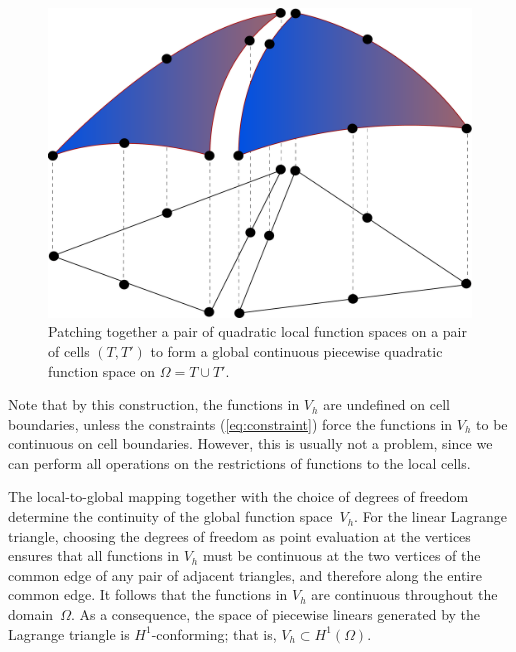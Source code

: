 \begin{figure}
  \begin{center}
    \includegraphics[width=\largefig]{chapters/kirby-7/pdf/femspace.pdf}
    \caption{Patching together a pair of quadratic local function
      spaces on a pair of cells $(T, T')$ to form a global continuous
      piecewise quadratic function space on $\Omega = T \cup T'$.}
    \label{fig:femspace}
  \end{center}
\end{figure}

Note that by this construction, the functions in $V_h$ are undefined
on cell boundaries, unless the constraints (\ref{eq:constraint}) force
the functions in $V_h$ to be continuous on cell boundaries. However,
this is usually not a problem, since we can perform all operations on
the restrictions of functions to the local cells.

The local-to-global mapping together with the choice of degrees of
freedom determine the continuity of the global function space~$V_h$.
For the linear Lagrange triangle, choosing the degrees of freedom as
point evaluation at the vertices ensures that all functions in $V_h$
must be continuous at the two vertices of the common edge of any pair
of adjacent triangles, and therefore along the entire common edge. It
follows that the functions in $V_h$ are continuous throughout the
domain~$\Omega$. As a consequence, the space of piecewise linears
generated by the Lagrange triangle is $H^1$-conforming; that is, $V_h
\subset H^1(\Omega)$.

